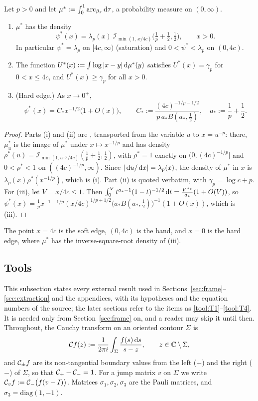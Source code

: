 \begin{proposition}\label{prop:equilibrium}
Let $p>0$ and let $\mu^*:=\int_0^1\mathrm{arc}_{\beta_\tau}\,\mathrm{d}\tau$, a probability measure on $(0,\infty)$.
\begin{enumerate}
\item[\textup{(i)}] $\mu^*$ has the density
  \[
    \psi^*(x)=\lambda_p(x)\,\mathcal I_{\min(1,\,x/4c)}\bigl(\tfrac1p+\tfrac12,\tfrac12\bigr),\qquad x>0 .
  \]
  In particular $\psi^*=\lambda_p$ on $[4c,\infty)$ (saturation) and $0<\psi^*<\lambda_p$ on $(0,4c)$.
\item[\textup{(ii)}] The function $U^*(x):=\int\log|x-y|\,\mathrm{d}\mu^*(y)$ satisfies $U^*(x)=\gamma_p$ for $0<x\le4c$, and
  $U^*(x)\ge\gamma_p$ for all $x>0$.
\item[\textup{(iii)}] (Hard edge.) As $x\to0^+$,
  \[
    \psi^*(x)=C_*x^{-1/2}\bigl(1+O(x)\bigr),\qquad C_*:=\frac{(4c)^{-1/p-1/2}}{p\,a_*B(a_*,\frac12)},\quad
    a_*:=\frac1p+\frac12 .
  \]
\end{enumerate}
\end{proposition}

\begin{proof}
Parts (i) and (ii) are \cite[Theorem~1.3(i)--(ii)]{Paper1}, transported from the variable $u$ to $x=u^{-p}$: there,
$\mu^*_u$ is the image of $\mu^*$ under $x\mapsto x^{-1/p}$ and has density
$\rho^*(u)=\mathcal I_{\min(1,u^{-p}/4c)}(\frac1p+\frac12,\frac12)$, with $\rho^*=1$ exactly on $(0,(4c)^{-1/p}]$ and
$0<\rho^*<1$ on $((4c)^{-1/p},\infty)$. Since $|\,\mathrm{d} u/\,\mathrm{d} x|=\lambda_p(x)$, the density of $\mu^*$ in $x$ is
$\lambda_p(x)\rho^*(x^{-1/p})$, which is (i). Part (ii) is quoted verbatim, with $\gamma_p=\log c+p$. For (iii), let
$V=x/4c\le1$. Then $\int_0^Vt^{a_*-1}(1-t)^{-1/2}\,\mathrm{d} t=\frac{V^{a_*}}{a_*}(1+O(V))$, so
$\psi^*(x)=\frac1px^{-1-1/p}(x/4c)^{1/p+1/2}\bigl(a_*B(a_*,\frac12)\bigr)^{-1}(1+O(x))$, which is (iii).
\end{proof}

The point $x=4c$ is the soft edge, $(0,4c)$ is the band, and $x=0$ is the hard edge, where $\mu^*$ has the
inverse-square-root density of (iii).

\subsection{Tools}\label{sec:tools}

This subsection states every external result used in Sections~\ref{sec:frame}--\ref{sec:extraction} and the
appendices, with its hypotheses and the equation numbers of the source; the later sections refer to the items as
\ref{tool:T1}--\ref{tool:T4}. It is needed only from Section~\ref{sec:frame} on, and a reader may skip it until then.
Throughout, the Cauchy transform on an oriented contour $\Sigma$ is
\[
  \mathcal{C} f(z):=\frac1{2\pi i}\int_\Sigma\frac{f(s)\,\mathrm{d} s}{s-z},\qquad z\in\mathbb{C}\setminus\Sigma,
\]
and $\mathcal{C}_\pm f$ are its non-tangential boundary values from the left ($+$) and the right ($-$) of $\Sigma$, so that
$\mathcal{C}_+-\mathcal{C}_-=1$. For a jump matrix $v$ on $\Sigma$ we write $\mathcal{C}_vf:=\mathcal{C}_-\bigl(f(v-I)\bigr)$. Matrices
$\sigma_1,\sigma_2,\sigma_3$ are the Pauli matrices, and $\sigma_3=\mathrm{diag}(1,-1)$.

